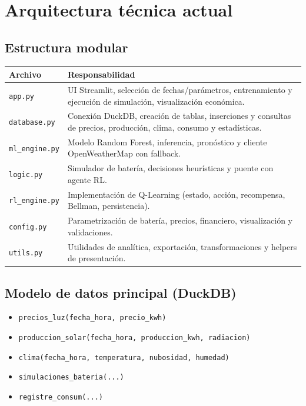 \documentclass[12pt,a4paper]{article}
\begin{document}
\section{Arquitectura t\'ecnica actual}
\subsection{Estructura modular}
\begin{longtable}{>{\raggedright\arraybackslash}p{} p{}}
\toprule
\textbf{Archivo} & \textbf{Responsabilidad} \\
\midrule
\texttt{app.py} & UI Streamlit, selecci\'on de fechas/par\'ametros, entrenamiento y ejecuci\'on de simulaci\'on, visualizaci\'on econ\'omica. \\
\texttt{database.py} & Conexi\'on DuckDB, creaci\'on de tablas, inserciones y consultas de precios, producci\'on, clima, consumo y estad\'isticas. \\
\texttt{ml\_engine.py} & Modelo Random Forest, inferencia, pron\'ostico y cliente OpenWeatherMap con fallback. \\
\texttt{logic.py} & Simulador de bater\'ia, decisiones heur\'isticas y puente con agente RL. \\
\texttt{rl\_engine.py} & Implementaci\'on de Q-Learning (estado, acci\'on, recompensa, Bellman, persistencia). \\
\texttt{config.py} & Parametrizaci\'on de bater\'ia, precios, financiero, visualizaci\'on y validaciones. \\
\texttt{utils.py} & Utilidades de anal\'itica, exportaci\'on, transformaciones y helpers de presentaci\'on. \\
\bottomrule
\end{longtable}

\subsection{Modelo de datos principal (DuckDB)}
\begin{itemize}
    \item \texttt{precios\_luz(fecha\_hora, precio\_kwh)}
    \item \texttt{produccion\_solar(fecha\_hora, produccion\_kwh, radiacion)}
    \item \texttt{clima(fecha\_hora, temperatura, nubosidad, humedad)}
    \item \texttt{simulaciones\_bateria(...)}
    \item \texttt{registre\_consum(...)}
\end{itemize}
\end{document}
